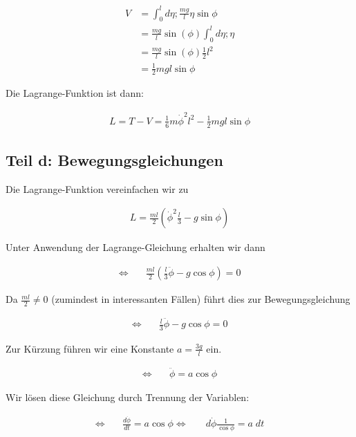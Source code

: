 \documentclass[a4paper,german,12pt,smallheadings]{scrartcl}
\begin{document}
\begin{align*}
  V &= \int_0^l d \eta; \frac{mg}{l} \eta \sin \phi \\
    &= \frac{mg}{l} \sin(\phi) \int_0^l d \eta; \eta \\
    &= \frac{mg}{l} \sin(\phi) \frac{1}{2} l^2 \\
    &= \frac{1}{2} mgl \sin \phi
\end{align*}

Die Lagrange-Funktion ist dann:

\begin{align*}
  L = T - V = \frac{1}{6} m \dot{\phi}^2 l^2 - \frac{1}{2} mgl \sin \phi
\end{align*}

\subsection*{Teil d: Bewegungsgleichungen}

Die Lagrange-Funktion vereinfachen wir zu

\begin{align*}
  L = \frac{ml}{2}\left(\dot{\phi}^2 \frac{l}{3} - g \sin \phi\right)
\end{align*}

Unter Anwendung der Lagrange-Gleichung erhalten wir dann

\begin{align*}
  \Leftrightarrow\quad&\frac{ml}{2} \left(\frac{l}{3} \ddot{\phi} - g \cos \phi\right) = 0
\end{align*}

Da $\frac{ml}{2} \neq 0$ (zumindest in interessanten Fällen) führt dies zur Bewegungsgleichung

\begin{align*}
  \Leftrightarrow\quad&\frac{l}{3} \ddot{\phi} - g \cos \phi = 0
\end{align*}

Zur Kürzung führen wir eine Konstante $a = \frac{3g}{l}$ ein.

\begin{align*}
  \Leftrightarrow\quad&\ddot{\phi} = a \cos \phi
\end{align*}

Wir lösen diese Gleichung durch Trennung der Variablen:

\begin{align*}
  \Leftrightarrow\quad&\frac{d \dot{\phi}}{dt} = a \cos \phi
  \Leftrightarrow\quad&d \dot{\phi} \frac{1}{\cos \phi} = a \; dt
\end{align*}
\end{document}
